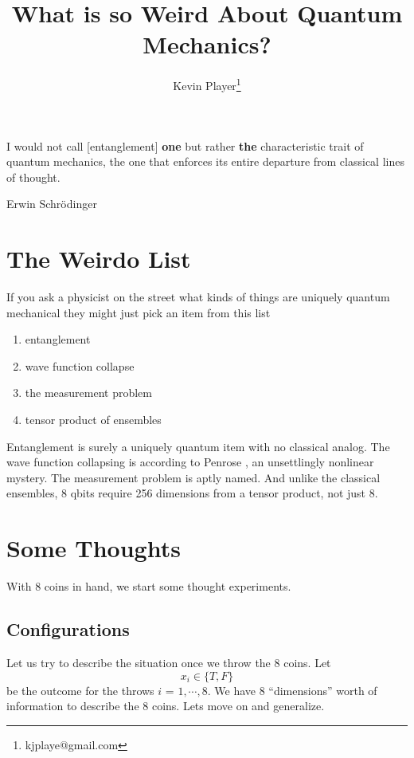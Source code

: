 \documentclass[12pt,a4paper]{article}
\begin{document}
\title{What is so Weird About Quantum Mechanics?}
\author[1]{Kevin Player\footnote{kjplaye@gmail.com}}

\maketitle


\epigraph{I would not call [entanglement] {\bf one} but rather {\bf the} characteristic trait of quantum mechanics, the one that enforces its entire departure from classical lines of thought.}{Erwin Schrödinger}


\section{The Weirdo List}
If you ask a physicist on the street what kinds of things are uniquely quantum mechanical they might just pick an item from this list

\begin{enumerate}
\item entanglement
\item wave function collapse
\item the measurement problem
\item tensor product of ensembles
\end{enumerate}

Entanglement is surely a uniquely quantum item with no classical analog.  The wave function collapsing is according to Penrose \cite{penrose}, an unsettlingly nonlinear mystery.  The measurement problem is aptly named.  And unlike the classical ensembles, 8 qbits require 256 dimensions from a tensor product, not just 8.

\section{Some Thoughts}
With 8 coins in hand, we start some thought experiments.
\subsection{Configurations}
Let us try to describe the situation once we throw the 8 coins.  Let
\[
x_i \in \{T,F\}
\]
be the outcome for the throws $i$ = $1,\cdots,8$.  We have 8 ``dimensions'' worth of information to describe the 8 coins.  Lets move on and generalize.
  
\end{document}

